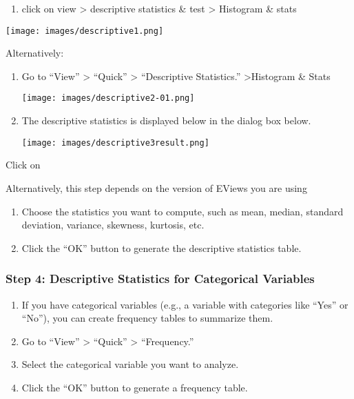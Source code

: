 \documentclass[
  letterpaper,
  DIV=11,
  numbers=noendperiod]{scrartcl}
\providecommand{\tightlist}{%
  \setlength{\itemsep}{0pt}\setlength{\parskip}{0pt}}\usepackage{longtable,booktabs,array}
\begin{document}
\begin{enumerate}
\def\labelenumi{\arabic{enumi}.}
\tightlist
\item
  click on view \textgreater{} descriptive statistics \& test
  \textgreater{} Histogram \& stats
\end{enumerate}

\texttt{[image: images/descriptive1.png]}

Alternatively:

\begin{enumerate}
\def\labelenumi{\arabic{enumi}.}
\item
  Go to ``View'' \textgreater{} ``Quick'' \textgreater{} ``Descriptive
  Statistics.'' \textgreater Histogram \& Stats

  \texttt{[image: images/descriptive2-01.png]}
\item
  The descriptive statistics is displayed below in the dialog box below.

  \texttt{[image: images/descriptive3result.png]}
\end{enumerate}

Click on

Alternatively, this step depends on the version of EViews you are using

\begin{enumerate}
\def\labelenumi{\arabic{enumi}.}
\tightlist
\item
  Choose the statistics you want to compute, such as mean, median,
  standard deviation, variance, skewness, kurtosis, etc.
\item
  Click the ``OK'' button to generate the descriptive statistics table.
\end{enumerate}

\hypertarget{step-4-descriptive-statistics-for-categorical-variables}{%
\subsubsection{\texorpdfstring{\textbf{Step 4: Descriptive Statistics
for Categorical
Variables}}{Step 4: Descriptive Statistics for Categorical Variables}}\label{step-4-descriptive-statistics-for-categorical-variables}}

\begin{enumerate}
\def\labelenumi{\arabic{enumi}.}
\tightlist
\item
  If you have categorical variables (e.g., a variable with categories
  like ``Yes'' or ``No''), you can create frequency tables to summarize
  them.
\item
  Go to ``View'' \textgreater{} ``Quick'' \textgreater{} ``Frequency.''
\item
  Select the categorical variable you want to analyze.
\item
  Click the ``OK'' button to generate a frequency table.
\end{enumerate}
\end{document}
